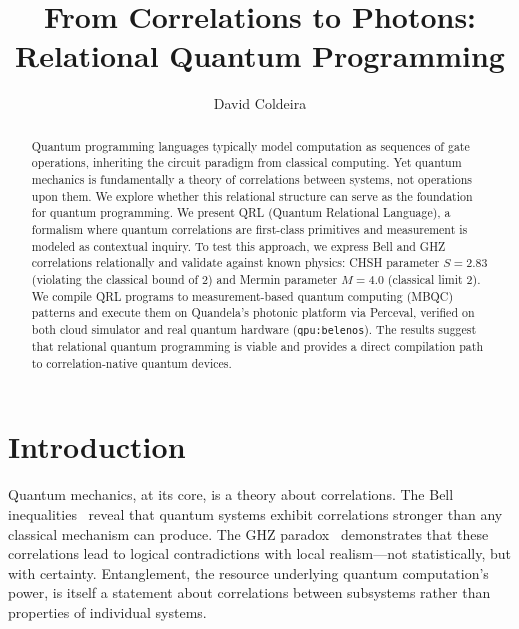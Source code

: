 \documentclass[submission,copyright,creativecommons]{eptcs}
\title{From Correlations to Photons:\\Relational Quantum Programming}
\author{David Coldeira
\institute{Independent Researcher}
\email{dcoldeira@gmail.com}}
\newcommand{\qrl}{\textsc{QRL}}
\begin{document}
\maketitle


\begin{abstract}
Quantum programming languages typically model computation as sequences of gate operations,
inheriting the circuit paradigm from classical computing. Yet quantum mechanics is
fundamentally a theory of correlations between systems, not operations upon them.
We explore whether this relational structure can serve as the foundation for quantum
programming. We present \qrl{} (Quantum Relational Language), a formalism where
quantum correlations are first-class primitives and measurement is modeled as
contextual inquiry. To test this approach, we express Bell and GHZ correlations
relationally and validate against known physics: CHSH parameter $S = 2.83$
(violating the classical bound of 2) and Mermin parameter $M = 4.0$
(classical limit 2). We compile \qrl{} programs to measurement-based quantum
computing (MBQC) patterns and execute them on Quandela's photonic
platform via Perceval, verified on both cloud simulator and real quantum
hardware (\texttt{qpu:belenos}). The results suggest that relational quantum
programming is viable and provides a direct compilation path to correlation-native
quantum devices.
\end{abstract}


\section{Introduction}
\label{sec:introduction}

Quantum mechanics, at its core, is a theory about correlations. The Bell
inequalities~\cite{bell1964} reveal that quantum systems exhibit correlations
stronger than any classical mechanism can produce. The GHZ paradox~\cite{ghz1989,mermin1990}
demonstrates that these correlations lead to logical contradictions with local
realism---not statistically, but with certainty. Entanglement, the resource
underlying quantum computation's power, is itself a statement about correlations
between subsystems rather than properties of individual systems.
\end{document}
